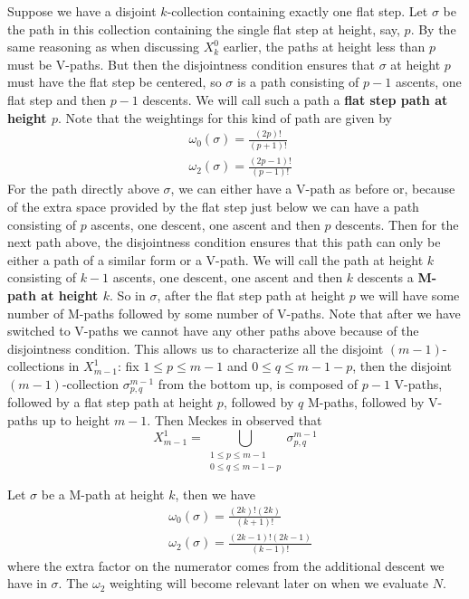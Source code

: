 \documentclass[11pt]{article}
\theoremstyle{definition}
\theoremstyle{definition}
\theoremstyle{plain}
\theoremstyle{plain}
\theoremstyle{plain}
\theoremstyle{definition}
\begin{document}
Suppose we have a disjoint $k$-collection containing exactly one flat step. Let $\sigma$ be the path in this collection containing the single flat step at height, say, $p$. By the same reasoning as when discussing $X_k^0$ earlier, the paths at height less than $p$ must be V-paths. But then the disjointness condition ensures that $\sigma$ at height $p$ must have the flat step be centered, so $\sigma$ is a path consisting of $p-1$ ascents, one flat step and then $p-1$ descents. We will call such a path a \textbf{flat step path at height $p$}. Note that the weightings for this kind of path are given by
\begin{align*}
&\omega_0(\sigma) = \frac{(2p)!}{(p+1)!} \\
&\omega_2(\sigma) = \frac{(2p-1)!}{(p-1)!}
\end{align*}
For the path directly above $\sigma$, we can either have a V-path as before or, because of the extra space provided by the flat step just below we can have a path consisting of $p$ ascents, one descent, one ascent and then $p$ descents. Then for the next path above, the disjointness condition ensures that this path can only be either a path of a similar form or a V-path. We will call the path at height $k$ consisting of $k-1$ ascents, one descent, one ascent and then $k$ descents a \textbf{M-path at height $k$}. So in $\sigma$, after the flat step path at height $p$ we will have some number of M-paths followed by some number of V-paths. Note that after we have switched to V-paths we cannot have any other paths above because of the disjointness condition. This allows us to characterize all the disjoint $(m-1)$-collections in $X_{m-1}^1$: fix $1\leq p\leq m-1$ and $0\leq q \leq m-1-p$, then the disjoint $(m-1)$-collection $\sigma_{p,q}^{m-1}$ from the bottom up, is composed of $p-1$ V-paths, followed by a flat step path at height $p$, followed by $q$ M-paths, followed by V-paths up to height $m-1$. Then Meckes in \cite{meckes_magnitude_2019} observed that
\begin{equation*}
X_{m-1}^1 = \bigcup\limits_{\substack{1\leq p \leq m-1 \\ 0\leq q \leq m-1-p}} \sigma_{p,q}^{m-1}
\end{equation*}

Let $\sigma$ be a M-path at height $k$, then we have
\begin{align*}
&\omega_0(\sigma) = \frac{(2k)!(2k)}{(k+1)!} \\
&\omega_2(\sigma) = \frac{(2k-1)!(2k-1)}{(k-1)!}
\end{align*}
where the extra factor on the numerator comes from the additional descent we have in $\sigma$. The $\omega_2$ weighting will become relevant later on when we evaluate $N$.
\end{document}

